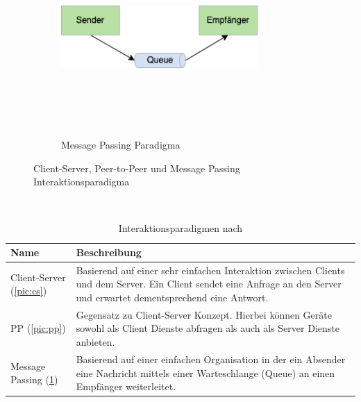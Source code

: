 \begin{figure}[hbt!]
\begin{subfigure}[b]{0.4\textwidth}
            \end{subfigure}
            \begin{subfigure}[b]{0.4\textwidth}
                \centering
                \includegraphics[width=7.5cm,height=7.5cm,keepaspectratio]{images/messagepassing.png}
                \caption{Message Passing Paradigma}
                \label{pic:messagepassing}
            \end{subfigure}
            \caption{Client-Server, Peer-to-Peer und Message Passing Interaktionsparadigma \cite{IEEE2015}}
            \label{pic:interactionparadigm}
        \end{figure}
        \\ 
        \begin{table}[hbt!]
            \begin{center}
                \begin{tabular}{| p{3cm} | p{12.75cm} | }
                    \hline
                        \textbf{Name} & \textbf{Beschreibung} \\
                    \hline
                        Client-Server (\ref{pic:cs}) & Basierend auf einer sehr einfachen Interaktion zwischen Clients und dem Server. Ein Client sendet eine Anfrage an den Server und erwartet dementsprechend eine Antwort. \\ 
                    \hline
                        \ac{PP} (\ref{pic:pp}) & Gegensatz zu Client-Server Konzept. Hierbei können Geräte sowohl als Client Dienste abfragen als auch als Server Dienste anbieten. \\ 
                    \hline
                        Message Passing (\ref{pic:messagepassing}) & Basierend auf einer einfachen Organisation in der ein Absender eine Nachricht mittels einer Warteschlange (Queue) an einen Empfänger weiterleitet. \\ 
                    \hline
                \end{tabular}
            \end{center}
            \caption{Interaktionsparadigmen nach \cite{IEEE2015}}
            \label{table:kommunikationdmodelle}
        \end{table}
